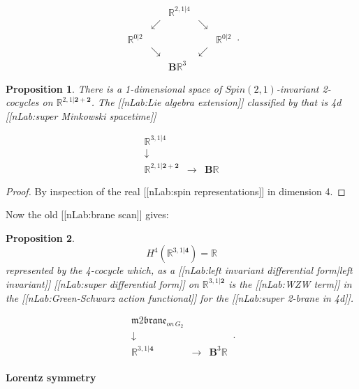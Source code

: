 \documentclass[12pt,titlepage]{article}
\newcommand{\itexarray}[1]{\begin{matrix}#1\end{matrix}}
\theoremstyle{plain}
\newtheorem{prop}{Proposition}
\theoremstyle{definition}
\theoremstyle{remark}
\begin{document}
\begin{displaymath}
\itexarray{
    && \mathbb{R}^{2,1\vert 4}
    \\
    & \swarrow && \searrow
    \\
    \mathbb{R}^{0 \vert 2} && && \mathbb{R}^{0\vert 2}
    \\
    & \searrow && \swarrow
    \\
    && \mathbf{B} \mathbb{R}^3
  }
  \,.
\end{displaymath}
\begin{prop}
\label{4dSuperMinkowskiSpacetime}\hypertarget{4dSuperMinkowskiSpacetime}{}
There is a 1-dimensional space of $Spin(2,1)$-invariant 2-cocycles on $\mathbb{R}^{2,1\vert \mathbf{2} + \mathbf{2}}$. The [[nLab:Lie algebra extension]] classified by that is 4d [[nLab:super Minkowski spacetime]]

\begin{displaymath}
\itexarray{
    \mathbb{R}^{3,1\vert 4}
    \\
    \downarrow
    \\
    \mathbb{R}^{2,1\vert \mathbf{2}+{\mathbf{2}}}
    &\longrightarrow&
    \mathbf{B}\mathbb{R}
  }
\end{displaymath}
\end{prop}
\begin{proof}
By inspection of the real [[nLab:spin representations]] in dimension 4.

\end{proof}
Now the old [[nLab:brane scan]] gives:

\begin{prop}
\label{TheStringIn4d}\hypertarget{TheStringIn4d}{}
\begin{displaymath}
H^4(\mathbb{R}^{3,1\vert \mathbf{4}}) = \mathbb{R}
\end{displaymath}
represented by the 4-cocycle which, as a [[nLab:left invariant differential form|left invariant]] [[nLab:super differential form]] on $\mathbb{R}^{3,1\vert \mathbf{2}}$ is the [[nLab:WZW term]] in the [[nLab:Green-Schwarz action functional]] for the [[nLab:super 2-brane in 4d]].

\begin{displaymath}
\itexarray{
     \mathfrak{m}2\mathfrak{brane}_{on\,G_2}
     \\
     \downarrow
     \\
     \mathbb{R}^{3,1\vert  \mathbf{4} }
      &\stackrel{}{\longrightarrow}&
     \mathbf{B}^3 \mathbb{R}
  }
  \,.
\end{displaymath}
\end{prop}
\hypertarget{lorentz_symmetry}{}\paragraph*{{Lorentz symmetry}}\label{lorentz_symmetry}
\end{document}
